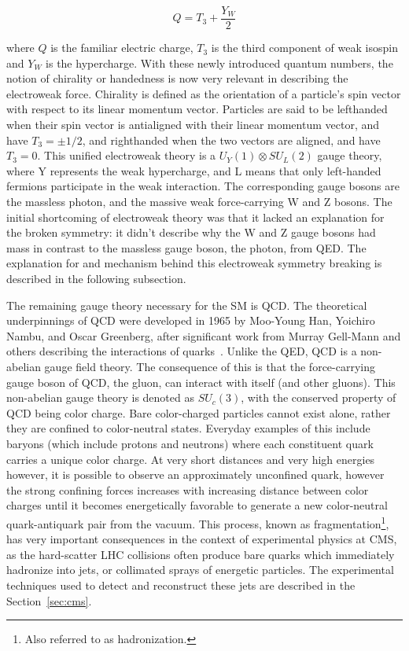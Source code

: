 \begin{equation}
\label{eqn:hypercharge}
Q = T_{3} + \frac{Y_{W}}{2}
\end{equation}
 
\noindent where $Q$ is the familiar electric charge, $T_{3}$ is the third component of weak isospin and $Y_{W}$ is the hypercharge. With these newly introduced quantum numbers,
the notion of chirality or handedness is now very relevant
in describing the electroweak force. Chirality is defined as the orientation of a particle's spin vector with respect to its linear momentum vector.
Particles are said to be lefthanded when their spin vector is antialigned with
their linear momentum vector, and have $T_{3}=\pm 1/2$, and righthanded when the two vectors are aligned, and have $T_{3}=0$.  
This unified electroweak theory is a
$U_{Y}(1) \otimes SU_{L}(2)$ gauge theory, where Y represents the weak hypercharge, and L means that only left-handed fermions participate in the weak interaction. 
The corresponding gauge bosons are the massless photon, and the massive weak force-carrying W and Z bosons.
The initial shortcoming of electroweak theory was that it lacked an explanation for the broken symmetry:
it didn't describe why the W and Z gauge bosons had mass in contrast to the massless gauge boson, the photon, from QED. 
The explanation for and mechanism behind this electroweak symmetry breaking is described in the following subsection.

The remaining gauge theory necessary for the SM is QCD. The theoretical underpinnings of QCD were developed in 1965 by Moo-Young Han, Yoichiro Nambu, and Oscar Greenberg, after
significant work from Murray Gell-Mann and others describing the interactions of quarks~\cite{NP69}.  
Unlike the QED, QCD is a non-abelian gauge field theory. The consequence of this is that the force-carrying gauge boson
of QCD, the gluon, can interact with itself (and other gluons). This non-abelian gauge theory is denoted as $SU_{c}(3)$, with the conserved property of QCD being color charge.
Bare color-charged particles
cannot exist alone, rather they are confined to color-neutral states. Everyday examples of this include baryons (which include protons and neutrons) where each constituent quark
carries a unique color charge. At very short distances and very high energies however, it is possible to observe an approximately unconfined quark, however the strong confining
forces increases with increasing distance between color charges until it becomes energetically favorable to generate a new color-neutral quark-antiquark pair from the vacuum.
This process, known as fragmentation\footnote{Also referred to as hadronization.}, has very important consequences in the context of experimental physics at CMS, as the hard-scatter LHC
collisions often produce bare quarks which immediately hadronize into jets, or collimated sprays of energetic particles.
The experimental techniques used to detect and reconstruct these jets are described in the Section~\ref{sec:cms}. 

